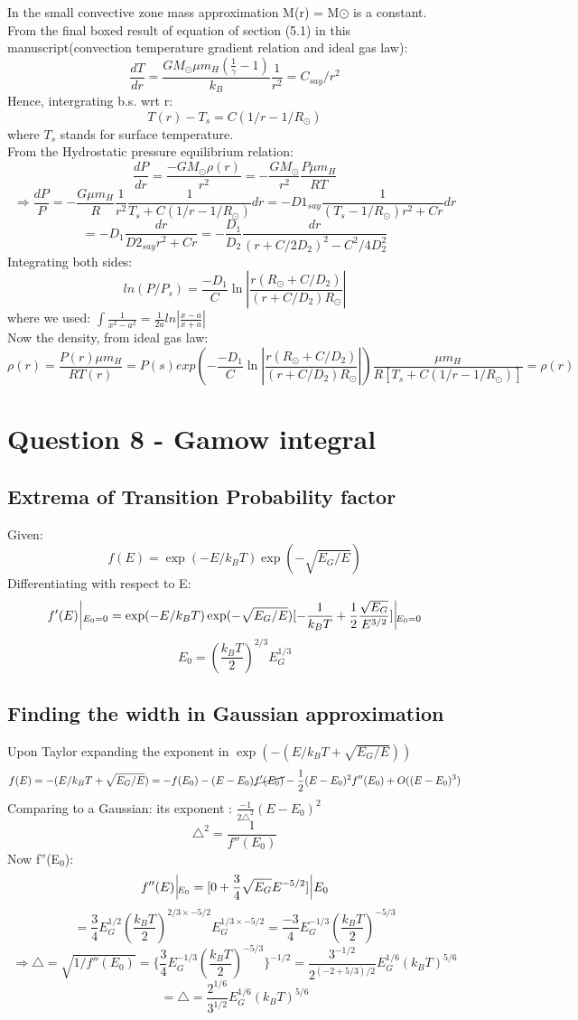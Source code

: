 \documentclass[11pt]{article}
\begin{document}
	In the small convective zone mass approximation M(r) = M$\odot$ is a constant.\\
	From the final boxed result of equation of section (5.1) in this manuscript(convection temperature gradient relation and ideal gas law):
	\[
		\frac{dT}{dr} = \frac{GM_\odot\mu m_H(\frac{1}{\gamma}-1)}{k_B} \frac{1}{r^2} = C_{say} /r^2
	\]
	Hence, intergrating b.s. wrt r:
	\[
		\boxed{T(r) - T_s = C (1/r - 1/R_\odot)}
	\]
	where $T_s$ stands for surface temperature.\\
	From the Hydrostatic pressure equilibrium relation:
	\[
		\frac{dP}{dr} = \frac{-GM_\odot \rho(r)}{r^2} = -\frac{G M_\odot}{r^2} \frac{P\mu m_H}{RT}
	\]
	\[
		\Rightarrow \frac{dP}{P} = - \frac{G\mu m_H}{R}\frac{1}{r^2}\frac{1}{T_s + C(1/r - 1/R_\odot)}dr  =-D1_{say}\frac{1}{(T_s-1/R_\odot)r^2 +Cr}dr 
	\]
	\[
		= -D_1\frac{dr}{D2_{say}r^2+Cr} = -\frac{D_1}{D_2}\frac{dr}{(r + C/2D_2)^2-C^2/4D_2^2}
	\]
	Integrating both sides:
	\[
		\boxed{ln(P/P_s) = \frac{-D_1}{C}\ln|\frac{r(R_\odot+C/D_2)}{(r+C/D_2)R_\odot}|}
	\]
	where we used:
	\(
	 	\int \frac{1}{x^2-a^2} = \frac{1}{2a}ln|\frac{x-a}{x+a}|
	\)\\
	Now the density, from ideal gas law:
	\[
		\rho(r)  = \frac{P(r)\mu m_H}{RT(r)} = \boxed{P(s)exp(-\frac{-D_1}{C}\ln|\frac{r(R_\odot+C/D_2)}{(r+C/D_2)R_\odot}|)\frac{\mu m_H}{R[T_s + C(1/r-1/R_\odot)]}=\rho(r)}
	\]
	
	\section{\color{teal}Question 8 - Gamow integral}
	
	\subsection{Extrema of Transition Probability factor}
	
	Given:
	\[
		f(E) = \exp(-E/k_BT)\exp(-\sqrt{E_G/E})
	\]
	Differentiating with respect to E:
	\[
		f'(E)\, \vline_{\, E_0 = 0} = \exp(-E/k_BT)\exp(-\sqrt{E_G/E})[-\frac{1}{k_BT} +\frac{1}{2}\frac{\sqrt{E_G}}{E^{3/2}}] \, \vline_{E_0=0}
	\]
	\[
		\boxed{E_0 = (\frac{k_BT}{2})^{2/3}E_G^{1/3}}
	\]
	\subsection{Finding the width in Gaussian approximation}
	
	Upon Taylor expanding the exponent in \(\exp(-(E/k_BT + \sqrt{E_G/E}))\)
	\[
		f(E) = -(E/k_BT + \sqrt{E_G/E}) = -f(E_0) - (E-E_0)\cancel{f'(E_0)} - \frac{1}{2}(E-E_0)^2 f''(E_0) + O((E-E_0)^3)
	\]
	Comparing to a Gaussian: its exponent : \(\frac{-1}{2\triangle^2}(E-E_0)^2\)
	\[
		\triangle^2 = \frac{1}{f''(E_0)}
	\]
	Now f''(E$_0$):
	\[
		f''(E) \, \vline_{E_0} = [0 + \frac{3}{4}\sqrt{E_G}E^{-5/2}]\, \vline{\, E_0}
	\]
	\[
		 = \frac{3}{4}E_G^{1/2} (\frac{k_BT}{2})^{2/3 \times -5/2} E_G^{1/3 \times -5/2} = \frac{-3}{4}E_G^{-1/3}(\frac{k_BT}{2})^{-5/3}
	\]
	\[
		\Rightarrow \triangle = \sqrt{1/f''(E_0)} =\{\frac{3}{4}E_G^{-1/3}(\frac{k_BT}{2})^{-5/3}\}^{-1/2} = \frac{3^{-1/2}}{2^{(-2+5/3)/2}}E_G^{1/6}(k_BT)^{5/6}
	\]
	\[
		= \boxed{\triangle = \frac{2^{1/6}}{3^{1/2}}E_G^{1/6}(k_BT)^{5/6}}
	\]
	
\end{document}
